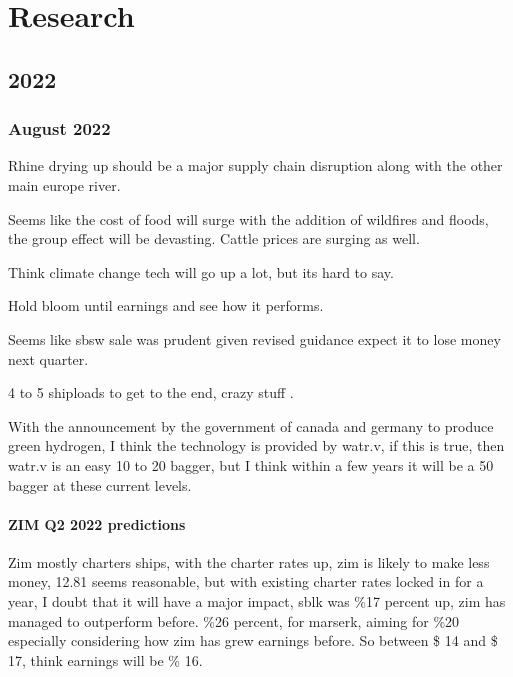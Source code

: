 \chapter{Research}


\section{2022}

\subsection{August 2022}

Rhine drying up should be a major supply chain disruption along with the other main europe river.

Seems like the cost of food will surge with the addition of wildfires and floods, the group effect will be devasting. Cattle prices are surging as well.

Think climate change tech will go up a lot, but its hard to say.

Hold bloom until earnings and see how it performs.

Seems like sbsw sale was prudent given revised guidance expect it to lose money next quarter.


4 to 5 shiploads to get to the end, crazy stuff \cite{youtube_2022}.

With the announcement by the government of canada and germany to produce green hydrogen, I think the technology is provided by watr.v, if this is true, then watr.v is an easy 10 to 20 bagger, but I think within a few years it will be a 50 bagger at these current levels.

\subsubsection{ZIM Q2 2022 predictions}

Zim mostly charters ships, with the charter rates up, zim is likely to make less money, 12.81 seems reasonable, but with existing charter rates locked in for a year, I doubt that it will have a major impact, sblk was \%17 percent up, zim has managed to outperform before. \%26 percent, for marserk, aiming for \%20 especially considering how zim has grew earnings before. So between \$ 14 and \$ 17, think earnings will be \% 16.


